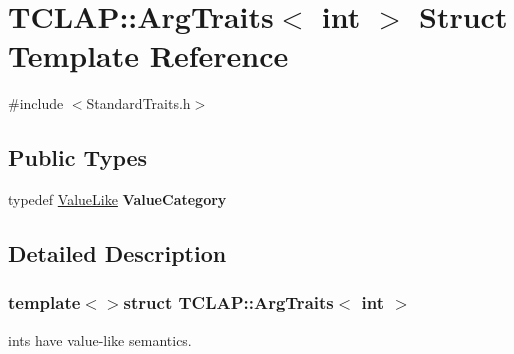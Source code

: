 \hypertarget{struct_t_c_l_a_p_1_1_arg_traits_3_01int_01_4}{\section{T\-C\-L\-A\-P\-:\-:Arg\-Traits$<$ int $>$ Struct Template Reference}
\label{struct_t_c_l_a_p_1_1_arg_traits_3_01int_01_4}
}


{\ttfamily \#include $<$Standard\-Traits.\-h$>$}

\subsection*{Public Types}
\begin{DoxyCompactItemize}
\item 
\hypertarget{struct_t_c_l_a_p_1_1_arg_traits_3_01int_01_4_a8e577764b626e9e928d71567123d92a9}{typedef \hyperlink{struct_t_c_l_a_p_1_1_value_like}{Value\-Like} {\bfseries Value\-Category}}\label{struct_t_c_l_a_p_1_1_arg_traits_3_01int_01_4_a8e577764b626e9e928d71567123d92a9}

\end{DoxyCompactItemize}


\subsection{Detailed Description}
\subsubsection*{template$<$$>$struct T\-C\-L\-A\-P\-::\-Arg\-Traits$<$ int $>$}

ints have value-\/like semantics. 
